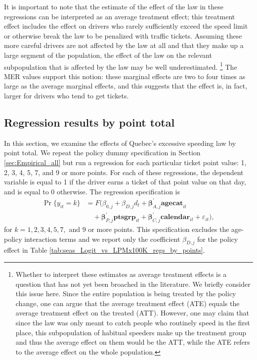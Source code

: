 It is important to note that the estimate of the effect of the law in these regressions 
can be interpreted as an average treatment effect; 
this treatment effect includes the effect on drivers 
who rarely sufficiently exceed the speed limit 
or otherwise break the law to be penalized with traffic tickets. 
Assuming these more careful drivers are not affected by the law at all 
and that they make up a large segment of the population, 
the effect of the law on the relevant subpopulation that is affected by the law 
may be well underestimated.%
\footnote{%
Whether to interpret these estimates as average treatment effects 
is a question that has not yet been broached in the literature. 
We briefly consider this issue here. 
Since the entire population is being treated by the policy change, 
one can argue that the average treatment effect (ATE) equals 
the average treatment effect on the treated (ATT). 
However, one may claim that since the law was only meant to catch people 
who routinely speed in the first place, 
this subpopulation of habitual speeders make up the treatment group 
and thus the average effect on them would be the ATT, 
while the ATE refers to the average effect on the whole population.
}
%
The MER values support this notion: 
these marginal effects are two to four times as large as the average marginal effects, 
and this suggests that the effect is, in fact, larger for drivers who tend to get tickets.

\subsection{Regression results by point total}
\label{sec:Empirical_by_pts}

In this section, we examine the effects of Quebec’s excessive speeding law by point total. 
We repeat the policy dummy specification in 
Section \ref{sec:Empirical_all} 
but run a regression for each particular ticket point value: 1, 2, 3, 4, 5, 7, and 9 or more points. 
For each of these regressions, the dependent variable is equal to 1 
if the driver earns a ticket of that point value on that day, and is equal to 0 otherwise. 
The regression specification is 
%
\begin{align*}
	\Pr\{y_{it} = k\} & 	
	= F( \beta_{0,j} + \beta_{D,j} d_t
	+ \bm{\beta}_{A,j}^{\prime} \bm{agecat}_{it} \\
	&	\quad
	+ \bm{\beta}_{P,j}^{\prime} \bm{ptsgrp}_{it}
	+ \bm{\beta}_{C,j}^{\prime} \bm{calendar}_{it}
	+ \varepsilon_{it} ),
\end{align*}
%
for $k = 1, 2, 3, 4, 5, 7,$ and $9$ or more points. 
This specification excludes the age-policy interaction terms and we report 
only the coefficient $\beta_{D,j}$ for the policy effect
in Table \ref{tab:seas_Logit_vs_LPMx100K_regs_by_points}. 

